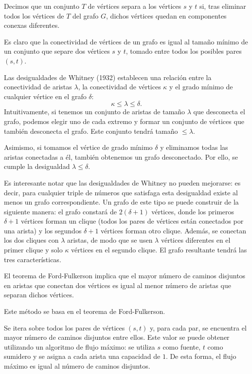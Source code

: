 \documentclass[a4paper]{article}
\begin{document}
Decimos que un conjunto \(T\) de vértices separa a los vértices \(s\) y \(t\) si, tras eliminar todos los vértices de \(T\) del grafo \(G\), dichos vértices quedan en componentes conexas diferentes.

Es claro que la conectividad de vértices de un grafo es igual al tamaño mínimo de un conjunto que separe dos vértices \(s\) y \(t\), tomado entre todos los posibles pares \((s, t)\).

Las desigualdades de Whitney (1932) establecen una relación entre la conectividad de aristas \(\lambda\), la conectividad de vértices \(\kappa\) y el grado mínimo de cualquier vértice en el grafo \(\delta\):
\[
\kappa \le \lambda \le \delta.
\]
Intuitivamente, si tenemos un conjunto de aristas de tamaño \(\lambda\) que desconecta el grafo, podemos elegir uno de cada extremo y formar un conjunto de vértices que también desconecta el grafo. Este conjunto tendrá tamaño \(\le \lambda\).

Asimismo, si tomamos el vértice de grado mínimo \(\delta\) y eliminamos todas las aristas conectadas a él, también obtenemos un grafo desconectado. Por ello, se cumple la desigualdad \(\lambda \le \delta\).

Es interesante notar que las desigualdades de Whitney no pueden mejorarse: es decir, para cualquier triple de números que satisfaga esta desigualdad existe al menos un grafo correspondiente. Un grafo de este tipo se puede construir de la siguiente manera: el grafo constará de \(2(\delta + 1)\) vértices, donde los primeros \(\delta + 1\) vértices forman un clique (todos los pares de vértices están conectados por una arista) y los segundos \(\delta + 1\) vértices forman otro clique. Además, se conectan los dos cliques con \(\lambda\) aristas, de modo que se usen \(\lambda\) vértices diferentes en el primer clique y solo \(\kappa\) vértices en el segundo clique. El grafo resultante tendrá las tres características.

El teorema de Ford-Fulkerson implica que el mayor número de caminos disjuntos en aristas que conectan dos vértices es igual al menor número de aristas que separan dichos vértices.


Este método se basa en el teorema de Ford-Fulkerson.

Se itera sobre todos los pares de vértices \((s, t)\) y, para cada par, se encuentra el mayor número de caminos disjuntos entre ellos. Este valor se puede obtener utilizando un algoritmo de flujo máximo: se utiliza \(s\) como fuente, \(t\) como sumidero y se asigna a cada arista una capacidad de \(1\). De esta forma, el flujo máximo es igual al número de caminos disjuntos.
\end{document}
